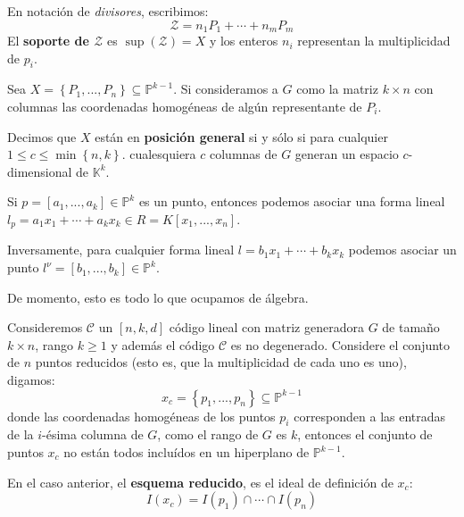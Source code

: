 \documentclass[12pt]{report}
\newcounter{it}
\theoremstyle{largebreak}
\begin{document}
    \begin{obs}
        En notación de \textit{divisores}, escribimos:
        \begin{equation*}
            \mathcal{Z}=n_1P_1+\cdots+n_mP_m
        \end{equation*}
        El \textbf{soporte de $\mathcal{Z}$} es $\sup\left(\mathcal{Z} \right)=X$ y los enteros $n_i$ representan la multiplicidad de $p_i$.
    \end{obs}

    \begin{mydef}
        Sea $X=\left\{P_1,...,P_n \right\}\subseteq\mathbb{P}^{ k-1}$. Si consideramos a $G$ como la matriz $k\times n$ con columnas las coordenadas homogéneas de algún representante de $P_i$.

        Decimos que $X$ están en \textbf{posición general} si y sólo si para cualquier $1\leq c\leq \min\left\{n,k \right\}$. cualesquiera $c$ columnas de $G$ generan un espacio $c$-dimensional de $\mathbb{K}^k$.
    \end{mydef}

    \begin{mydef}
        Si $p=[a_1,...,a_k]\in\mathbb{P}^k$ es un punto, entonces podemos asociar una forma lineal $l_p=a_1x_1+\cdots+a_kx_k\in R=K[x_1,...,x_n]$.
        
        Inversamente, para cualquier forma lineal $l=b_1x_1+\cdots+b_kx_k$ podemos asociar un punto $l^\nu=[b_1,...,b_k]\in\mathbb{P}^k$. 
    \end{mydef}

    De momento, esto es todo lo que ocupamos de álgebra.

    Consideremos $\mathcal{C}$ un $[n,k,d]$ código lineal con matriz generadora $G$ de tamaño $k\times n$, rango $k\geq 1$ y además el código $\mathcal{C}$ es no degenerado. Considere el conjunto de $n$ puntos reducidos (esto es, que la multiplicidad de cada uno es uno), digamos:
    \begin{equation*}
        x_c=\left\{p_1,...,p_n \right\}\subseteq\mathbb{P}^{ k-1}
    \end{equation*}
    donde las coordenadas homogéneas de los puntos $p_i$ corresponden a las entradas de la $i$-ésima columna de $G$, como el rango de $G$ es $k$, entonces el conjunto de puntos $x_c$ no están todos incluídos en un hiperplano de $\mathbb{P}^{ k-1}$.

    \begin{mydef}
        En el caso anterior, el \textbf{esquema reducido}, es el ideal de definición de $x_c$:
        \begin{equation*}
            I(x_c)=I(p_1)\cap\cdots\cap I(p_n)
        \end{equation*}
    \end{mydef}
\end{document}
